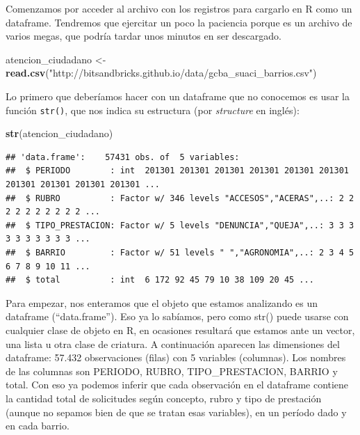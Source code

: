 \documentclass[]{book}
\newenvironment{Shaded}{\begin{snugshade}}{\end{snugshade}}
\newcommand{\KeywordTok}[1]{\textcolor[rgb]{0.13,0.29,0.53}{\textbf{#1}}}
\newcommand{\StringTok}[1]{\textcolor[rgb]{0.31,0.60,0.02}{#1}}
\newcommand{\NormalTok}[1]{#1}
\begin{document}
Comenzamos por acceder al archivo con los registros para cargarlo en R
como un dataframe. Tendremos que ejercitar un poco la paciencia porque
es un archivo de varios megas, que podría tardar unos minutos en ser
descargado.

\begin{Shaded}
\begin{Highlighting}[]
\NormalTok{atencion_ciudadano <-}\StringTok{ }\KeywordTok{read.csv}\NormalTok{(}\StringTok{"http://bitsandbricks.github.io/data/gcba_suaci_barrios.csv"}\NormalTok{)}
\end{Highlighting}
\end{Shaded}

Lo primero que deberíamos hacer con un dataframe que no conocemos es
usar la función \texttt{str()}, que nos indica su estructura (por
\emph{structure} en inglés):

\begin{Shaded}
\begin{Highlighting}[]
\KeywordTok{str}\NormalTok{(atencion_ciudadano)}
\end{Highlighting}
\end{Shaded}

\begin{verbatim}
## 'data.frame':    57431 obs. of  5 variables:
##  $ PERIODO        : int  201301 201301 201301 201301 201301 201301 201301 201301 201301 201301 ...
##  $ RUBRO          : Factor w/ 346 levels "ACCESOS","ACERAS",..: 2 2 2 2 2 2 2 2 2 2 ...
##  $ TIPO_PRESTACION: Factor w/ 5 levels "DENUNCIA","QUEJA",..: 3 3 3 3 3 3 3 3 3 3 ...
##  $ BARRIO         : Factor w/ 51 levels " ","AGRONOMIA",..: 2 3 4 5 6 7 8 9 10 11 ...
##  $ total          : int  6 172 92 45 79 10 38 109 20 45 ...
\end{verbatim}

Para empezar, nos enteramos que el objeto que estamos analizando es un
dataframe (``data.frame''). Eso ya lo sabíamos, pero como str() puede
usarse con cualquier clase de objeto en R, en ocasiones resultará que
estamos ante un vector, una lista u otra clase de criatura. A
continuación aparecen las dimensiones del dataframe: 57.432
observaciones (filas) con 5 variables (columnas). Los nombres de las
columnas son PERIODO, RUBRO, TIPO\_PRESTACION, BARRIO y total. Con eso
ya podemos inferir que cada observación en el dataframe contiene la
cantidad total de solicitudes según concepto, rubro y tipo de prestación
(aunque no sepamos bien de que se tratan esas variables), en un período
dado y en cada barrio.
\end{document}
